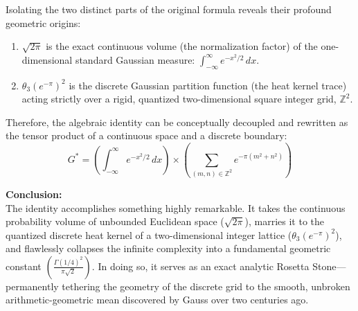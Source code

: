 \documentclass[11pt]{article}
\begin{document}
Isolating the two distinct parts of the original formula reveals their profound geometric origins:
\begin{enumerate}
    \item \textbf{$\sqrt{2\pi}$} is the exact continuous volume (the normalization factor) of the one-dimensional standard Gaussian measure: $\int_{-\infty}^\infty e^{-x^2/2} \, dx$.
    \item \textbf{$\theta_3(e^{-\pi})^2$} is the discrete Gaussian partition function (the heat kernel trace) acting strictly over a rigid, quantized two-dimensional square integer grid, $\mathbb{Z}^2$.
\end{enumerate}

Therefore, the algebraic identity can be conceptually decoupled and rewritten as the tensor product of a continuous space and a discrete boundary:
\begin{equation}
    G^* = \left( \int_{-\infty}^\infty e^{-x^2/2} \, dx \right) \times \left( \sum_{(m,n) \in \mathbb{Z}^2} e^{-\pi(m^2+n^2)} \right)
\end{equation}

\vspace{0.4cm}
\noindent \textbf{Conclusion:} \\
The identity accomplishes something highly remarkable. It takes the continuous probability volume of unbounded Euclidean space ($\sqrt{2\pi}$), marries it to the quantized discrete heat kernel of a two-dimensional integer lattice ($\theta_3(e^{-\pi})^2$), and flawlessly collapses the infinite complexity into a fundamental geometric constant $\left(\frac{\Gamma(1/4)^2}{\pi\sqrt{2}}\right)$. In doing so, it serves as an exact analytic Rosetta Stone---permanently tethering the geometry of the discrete grid to the smooth, unbroken arithmetic-geometric mean discovered by Gauss over two centuries ago.
\end{document}
